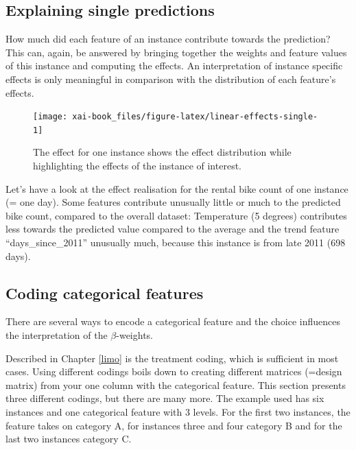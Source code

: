 \documentclass[12pt,]{krantz}
\theoremstyle{definition}
\theoremstyle{definition}
\theoremstyle{definition}
\theoremstyle{remark}
\begin{document}
\subsection{Explaining single
predictions}\label{explaining-single-predictions}

How much did each feature of an instance contribute towards the
prediction? This can, again, be answered by bringing together the
weights and feature values of this instance and computing the effects.
An interpretation of instance specific effects is only meaningful in
comparison with the distribution of each feature's effects.

\begin{figure}

{\centering \texttt{[image: xai-book\_files/figure-latex/linear-effects-single-1]} 

}

\caption{The effect for one instance shows the effect distribution while highlighting the effects of the instance of interest.}\label{fig:linear-effects-single}
\end{figure}

Let's have a look at the effect realisation for the rental bike count of
one instance (= one day). Some features contribute unusually little or
much to the predicted bike count, compared to the overall dataset:
Temperature (5 degrees) contributes less towards the predicted value
compared to the average and the trend feature ``days\_since\_2011''
unusually much, because this instance is from late 2011 (698 days).

\subsection{Coding categorical features}\label{cat.code}

There are several ways to encode a categorical feature and the choice
influences the interpretation of the \(\beta\)-weights.

Described in Chapter \ref{limo} is the treatment coding, which is
sufficient in most cases. Using different codings boils down to creating
different matrices (=design matrix) from your one column with the
categorical feature. This section presents three different codings, but
there are many more. The example used has six instances and one
categorical feature with 3 levels. For the first two instances, the
feature takes on category A, for instances three and four category B and
for the last two instances category C.
\end{document}
